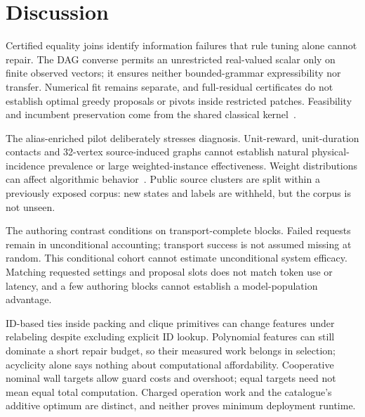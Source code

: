 \section{Discussion}
\label{sec:discussion}

Certified equality joins identify information failures that rule tuning alone
cannot repair. The DAG converse permits an unrestricted real-valued scalar
only on finite observed vectors; it ensures neither bounded-grammar
expressibility nor transfer. Numerical fit remains separate, and
full-residual certificates do not establish optimal greedy proposals or pivots
inside restricted patches. Feasibility and incumbent preservation come from
the shared classical kernel~\cite{lamm2019weighted}.

The alias-enriched pilot deliberately stresses diagnosis. Unit-reward,
unit-duration contacts and 32-vertex source-induced graphs cannot establish
natural physical-incidence prevalence or large weighted-instance effectiveness.
Weight distributions can affect algorithmic behavior~\cite{mccreesh2017evaluation}.
Public source clusters are split within a previously exposed corpus: new
states and labels are withheld, but the corpus is not unseen.

The authoring contrast conditions on transport-complete blocks. Failed
requests remain in unconditional accounting; transport success is not assumed
missing at random. This conditional cohort cannot estimate unconditional
system efficacy. Matching requested settings and proposal slots does not match
token use or latency, and a few authoring blocks cannot establish a
model-population advantage.

ID-based ties inside packing and clique primitives can change features under
relabeling despite excluding explicit ID lookup. Polynomial features can still
dominate a short repair budget, so their measured work belongs in selection;
acyclicity alone says nothing about computational affordability. Cooperative nominal wall
targets allow guard costs and overshoot; equal targets need not mean equal
total computation. Charged operation work and the catalogue's additive optimum
are distinct, and neither proves minimum deployment runtime.
